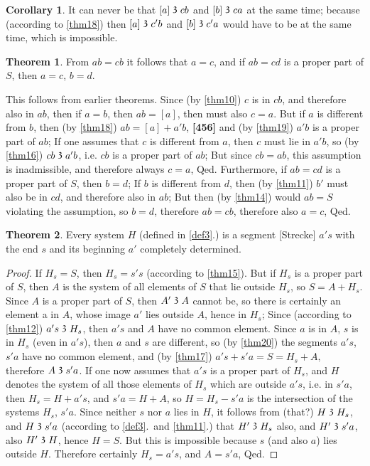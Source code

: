 \documentclass[leqno]{article}
\theoremstyle{definition}
\newtheorem{theorem}{Theorem}
\newtheorem*{corollary}{Corollary}
\newcommand\partof{\mathrel{\raisebox{0.45ex}{$\mathfrak{3}$}}}
\begin{document}
\begin{corollary}
It can never be that $[a] \partof cb$ and $[b] \partof ca$ at the same time; because (according to \ref{thm18}) then $[a] \partof c'b$ and $[b] \partof c'a$ would have to be at the same time, which is impossible.
\end{corollary}
\begin{theorem}\label{thm26}
From $ab=cb$ it follows that $a=c$, and if $ab=cd$ is a proper part of $S$, then $a=c$, $b = d$.
\end{theorem}

This follows from earlier theorems. 
Since (by \ref{thm10}) $c$ is in $cb$, and therefore also in $ab$, then if $a=b$, then $ab = [a]$, then must also $c=a$. 
But if $a$ is different from $b$, then (by \ref{thm18}) $ab = [a]+a'b$, \textbf{[456]} and (by \ref{thm19}) $a'b$ is a proper part of $ab$; 
If one assumes that $c$ is different from $a$, then $c$ must lie in $a'b$, so (by \ref{thm16}) $cb \partof a'b$, i.e. $cb$ is a proper part of $ab$; 
But since $cb=ab$, this assumption is inadmissible, and therefore always $c=a$, Qed. 
Furthermore, if $ab=cd$ is a proper part of $S$, then $b=d$; If $b$ is different from $d$, then (by \ref{thm11}) $b'$ must also be in $cd$, and therefore also in $ab$; But then (by \ref{thm14}) would $ab = S$ violating the assumption, so $b=d$, therefore $ab=cb$, therefore also $a=c$, Qed.

\begin{theorem}\label{thm27}
Every system $H$ (defined in \ref{def3}.) is a segment [Strecke] $a's$ with the end $s$ and its beginning $a'$ completely determined.
\end{theorem}
\begin{proof}
If $H_s= S$, then $H_s= s's$ (according to \ref{thm15}). 
But if $H_s$ is a proper part of $S$, then $A$ is the system of all elements of $S$ that lie outside $H_s$, so $S=A+H_s$. 
Since $A$ is a proper part of $S$, then $A' \partof A$ cannot be, so there is certainly an element a in $A$, whose image $a'$ lies outside $A$, hence in $H_s$; 
Since (according to \ref{thm12}) $a's \partof H_s$, then $a's$ and $A$ have no common element. 
Since $a$ is in $A$, $s$ is in $H_s$ (even in $a's$), then $a$ and $s$ are different, so (by \ref{thm20}) the segments $a's$, $s'a$ have no common element, and (by \ref{thm17}) $a's+  s'a=S=H_s+ A,$ therefore $A \partof s'a$. 
If one now assumes that $a's$ is a proper part of $H_s$, and $H$ denotes the system of all those elements of $H_s$ which are outside $a's$, i.e. in $s'a$, then $H_s = H+a's$, and $s'a = H + A$, so $H=H_s-s'a$ is the intersection of the systems $H_s$, $s'a$. 
Since neither $s$ nor $a$ lies in $H$, it follows from (that?) $H \partof H_s$, and $H \partof s'a$ (according to \ref{def3}.\ and \ref{thm11}.) that $H' \partof H_s$ also, and $H' \partof s'a$, also $H' \partof H$, hence $H=S$. 
But this is impossible because $s$ (and also $a$) lies outside $H$. Therefore certainly $H_s= a's$, and $A=s'a$, Qed.
\end{proof}
\end{document}
